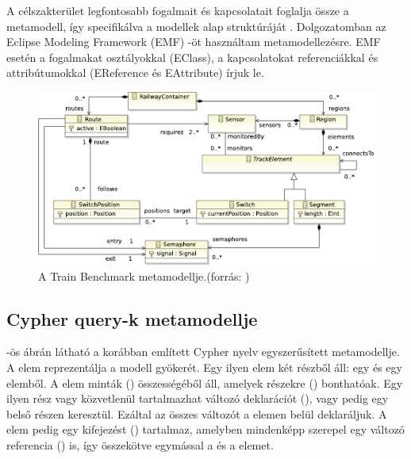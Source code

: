 A célszakterület legfontosabb fogalmait és kapcsolatait foglalja össze a metamodell, így specifikálva a modellek alap struktúráját \cite{semerath2017formal}. Dolgozatomban az Eclipse Modeling Framework (EMF) \cite{EMF} -öt használtam metamodellezésre. EMF esetén a fogalmakat osztályokkal (EClass), a kapcsolatokat referenciákkal és attribútumokkal (EReference és EAttribute) írjuk le.

\begin{figure}
	\centering
	\includegraphics[width=1\textwidth]{figures/trainbenchmarkfig2}
	\caption{A Train Benchmark metamodellje.(forrás: \cite{szarnyas2018train})}
	\label{fig:trainbenchmarkmetamodell}
\end{figure}

\subsection{Cypher query-k metamodellje}

 -ös ábrán látható a korábban említett Cypher nyelv egyszerűsített metamodellje.
A  elem reprezentálja a modell gyökerét. Egy ilyen elem két részből áll: egy  
és egy  elemből. A  elem minták () összességéből áll, amelyek 
részekre () bonthatóak. Egy ilyen rész vagy közvetlenül tartalmazhat változó deklarációt (), vagy pedig egy belső részen keresztül.
Ezáltal az összes változót a  elemen belül deklaráljuk. A  elem  pedig egy
kifejezést () tartalmaz, amelyben mindenképp szerepel egy változó referencia
 () is, így összekötve egymással a  és a  elemet. 

